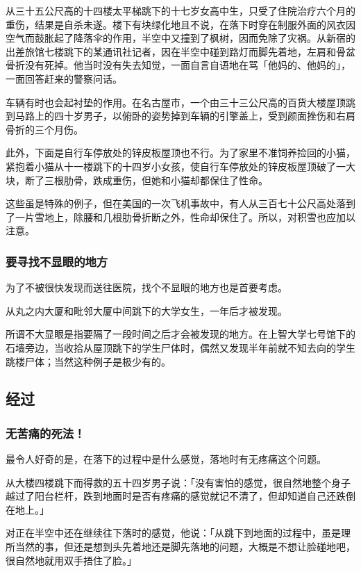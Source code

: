 \documentclass[UTF8]{ctexart}
\begin{document}
从三十五公尺高的十四楼太平梯跳下的十七岁女高中生，只受了住院治疗六个月的重伤，结果是自杀未遂。楼下有块绿化地且不说，在落下时穿在制服外面的风衣因空气而鼓胀起了降落伞的作用，半空中又撞到了枫树，因而免除了灾祸。从新宿的出差旅馆七楼跳下的某通讯社记者，因在半空中碰到路灯而脚先着地，左肩和骨盆骨折没有死掉。他当时没有失去知觉，一面自言自语地在骂「他妈的、他妈的」，一面回答赶来的警察问话。

车辆有时也会起衬垫的作用。在名古屋市，一个由三十三公尺高的百货大楼屋顶跳到马路上的四十岁男子，以俯卧的姿势掉到车辆的引擎盖上，受到颜面挫伤和右肩骨折的三个月伤。

此外，下面是自行车停放处的锌皮板屋顶也不行。为了家里不准饲养捡回的小猫，紧抱着小猫从十一楼跳下的十四岁小女孩，使自行车停放处的锌皮板屋顶破了一大块，断了三根肋骨，跌成重伤，但她和小猫却都保住了性命。

这些虽是特殊的例子，但在美国的一次飞机事故中，有人从三百七十公尺高处落到了一片雪地上，除腰和几根肋骨折断之外，性命却保住了。所以，对积雪也应加以注意。

\subsubsection*{要寻找不显眼的地方}

为了不被很快发现而送往医院，找个不显眼的地方也是首要考虑。

从丸之内大厦和毗邻大厦中间跳下的大学女生，一年后才被发现。

所谓不大显眼是指要隔了一段时间之后才会被发现的地方。在上智大学七号馆下的石墙旁边，当收拾从屋顶跳下的学生尸体时，偶然又发现半年前就不知去向的学生跳楼尸体；当然这种例子是极少有的。

\subsection{经过}

\subsubsection*{无苦痛的死法！}

最令人好奇的是，在落下的过程中是什么感觉，落地时有无疼痛这个问题。

从大楼四楼跳下而得救的五十四岁男子说：「没有害怕的感觉，很自然地整个身子越过了阳台栏杆，跌到地面时是否有疼痛的感觉就记不清了，但却知道自己还跌倒在地上。」

对正在半空中还在继续往下落时的感觉，他说：「从跳下到地面的过程中，虽是理所当然的事，但还是想到头先着地还是脚先落地的问题，大概是不想让脸碰地吧，很自然地就用双手捂住了脸。」
\end{document}
